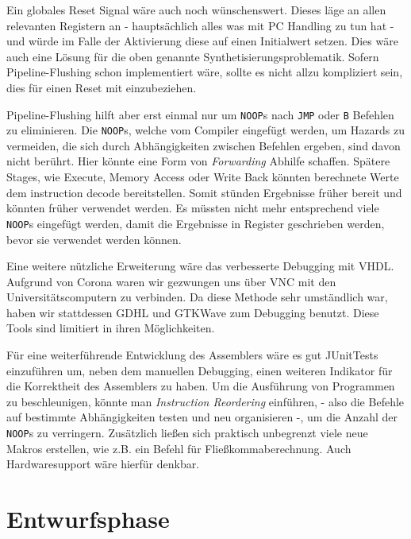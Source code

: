 \documentclass[paper=a4,fontsize=11pt,twocolumn]{scrreprt}
\begin{document}
Ein globales Reset Signal wäre auch noch wünschenswert.
Dieses läge an allen relevanten Registern an - hauptsächlich alles was mit PC Handling zu tun hat - und würde im Falle der Aktivierung diese auf einen Initialwert setzen.
Dies wäre auch eine Lösung für die oben genannte Synthetisierungsproblematik.
Sofern Pipeline-Flushing schon implementiert wäre, sollte es nicht allzu kompliziert sein, dies für einen Reset mit einzubeziehen.

Pipeline-Flushing hilft aber erst einmal nur um \texttt{NOOP}s nach \texttt{JMP} oder \texttt{B} Befehlen zu eliminieren.
Die \texttt{NOOP}s, welche vom Compiler eingefügt werden, um Hazards zu vermeiden, die sich durch Abhängigkeiten zwischen Befehlen ergeben, sind davon nicht berührt.
Hier könnte eine Form von \textit{Forwarding} \autocite{forwarding} Abhilfe schaffen.
Spätere Stages, wie Execute, Memory Access oder Write Back könnten berechnete Werte dem instruction decode bereitstellen.
Somit stünden Ergebnisse früher bereit und könnten früher verwendet werden.
Es müssten nicht mehr entsprechend viele \texttt{NOOP}s eingefügt werden, damit die Ergebnisse in Register geschrieben werden, bevor sie verwendet werden können.

Eine weitere nützliche Erweiterung wäre das verbesserte Debugging mit VHDL.
Aufgrund von Corona waren wir gezwungen uns über VNC mit den Universitätscomputern zu verbinden.
Da diese Methode sehr umständlich war, haben wir stattdessen GDHL und GTKWave zum Debugging benutzt.
Diese Tools sind limitiert in ihren Möglichkeiten.

Für eine weiterführende Entwicklung des Assemblers wäre es gut JUnitTests einzuführen um, neben dem manuellen Debugging, einen weiteren Indikator für die Korrektheit des Assemblers zu haben. 
Um die Ausführung von Programmen zu beschleunigen, könnte man \textit{Instruction Reordering} \autocite{instructionreordering} einführen, - also die Befehle auf bestimmte Abhängigkeiten testen und neu organisieren -, um die Anzahl der \texttt{NOOP}s zu verringern.
Zusätzlich ließen sich praktisch unbegrenzt viele neue Makros erstellen, wie z.B. ein Befehl für Fließkommaberechnung.
Auch Hardwaresupport wäre hierfür denkbar.

\onecolumn
\printbibliography

\appendix

\chapter{Entwurfsphase}
\end{document}
